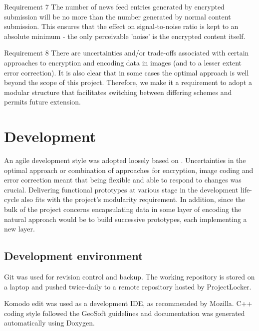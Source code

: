 \begin{desc}
    \item[Requirement 7] The number of news feed entries generated by encrypted submission will be no more than the number generated by normal content submission. This ensures that the effect on signal-to-noise ratio is kept to an absolute minimum - the only perceivable 'noise' is the encrypted content itself.
    

    \item[Requirement 8] There are uncertainties and/or trade-offs associated with certain approaches to encryption and encoding data in images (and to a lesser extent error correction). It is also clear that in some cases the optimal approach is well beyond the scope of this project. Therefore, we make it a requirement to adopt a modular structure that facilitates switching between differing schemes and permits future extension.
    
\end{desc}


   
\FloatBarrier 
\section{Development}
        
An agile development style was adopted loosely based on \cite{agile}. Uncertainties in the optimal approach or combination of approaches for encryption, image coding and error correction meant that being flexible and able to respond to changes was crucial. Delivering functional prototypes at various stage in the development life-cycle also fits with the project's modularity requirement. In addition, since the bulk of the project concerns encapsulating data in some layer of encoding the natural approach would be to build successive prototypes, each implementing a new layer.

\subsection{Development environment}

Git was used for revision control and backup. The working repository is stored on a laptop and pushed twice-daily to a remote repository hosted by ProjectLocker.

Komodo edit was used as a development IDE, as recommended by Mozilla. C++ coding style followed the GeoSoft guidelines \cite{code-style} and documentation was generated automatically using Doxygen.

